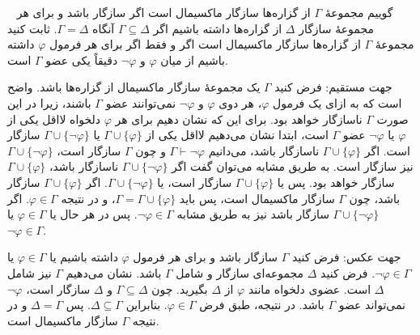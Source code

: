~
گوییم مجموعهٔ
$\Gamma$
از گزاره‌ها
سازگار ماکسیمال است اگر سازگار باشد و برای هر مجموعهٔ سازگار
$\Delta$
از گزاره‌ها داشته باشیم اگر
$\Gamma\subseteq\Delta$
آنگاه
$\Gamma=\Delta$. ثابت کنید مجموعهٔ
$\Gamma$
از گزاره‌ها سازگار ماکسیمال است اگر و فقط اگر برای هر فرمول
$\varphi$
داشته باشیم از میان
$\varphi$
و
$\neg\varphi$
دقیقاً یکی عضو
$\Gamma$
است.
\begin{ans}
  جهت مستقیم: فرض کنید $\Gamma$ یک مجموعهٔ سازگار ماکسیمال از گزاره‌ها باشد. واضح است که به ازای یک فرمول $\varphi$، هر دوی $\varphi$ و $\neg \varphi$ نمی‌توانند عضو $\Gamma$ باشند، زیرا در این صورت $\Gamma$ ناسازگار خواهد بود. برای این که نشان دهیم برای هر $\varphi$ دلخواه لااقل یکی از $\varphi$ یا $\neg \varphi$ عضو $\Gamma$ است، ابتدا نشان می‌دهیم لااقل یکی از $\Gamma \cup \{\varphi\}$ یا $\Gamma \cup \{\neg \varphi\}$ سازگار است. اگر $\Gamma \cup \{\varphi\}$ ناسازگار باشد، می‌دانیم $\Gamma \vdash \neg \varphi$ و چون $\Gamma$ سازگار است، $\Gamma \cup \{\neg \varphi\}$ نیز سازگار است. به طریق مشابه می‌توان گفت اگر $\Gamma \cup \{\neg \varphi\}$ ناسازگار باشد، $\Gamma \cup \{\varphi\}$ سازگار خواهد بود. پس یا $\Gamma \cup \{\varphi\}$ سازگار است، یا $\Gamma \cup \{\neg \varphi\}$. اگر $\Gamma \cup \{\varphi\}$ سازگار باشد، چون $\Gamma$ سازگار ماکسیمال است، پس باید $\Gamma = \Gamma \cup \{\varphi\}$، و در نتیجه $\varphi \in \Gamma$. اگر $\Gamma \cup \{\neg \varphi\}$ سازگار باشد نیز به طریق مشابه $\neg \varphi \in \Gamma$. پس در هر حال یا $\varphi \in \Gamma$ یا $\neg \varphi \in \Gamma$.

  جهت عکس: فرض کنید $\Gamma$ سازگار باشد و برای هر فرمول $\varphi$ داشته باشیم یا $\varphi \in \Gamma$ یا $\neg \varphi \in \Gamma$. فرض کنید $\Delta$ مجموعه‌ای سازگار و شامل $\Gamma$ باشد. نشان می‌دهیم $\Gamma$ نیز شامل $\Delta$ است. عضوی دلخواه مانند $\varphi$ از $\Delta$ بگیرید. چون $\Gamma \subseteq \Delta$ و $\Delta$ سازگار است، $\neg \varphi$ نمی‌تواند عضو $\Gamma$ باشد. در نتیجه، طبق فرض $\varphi \in \Gamma$. بنابراین $\Delta \subseteq \Gamma$. پس $\Delta = \Gamma$ و در نتیجه $\Gamma$ سازگار ماکسیمال است.
\end{ans}